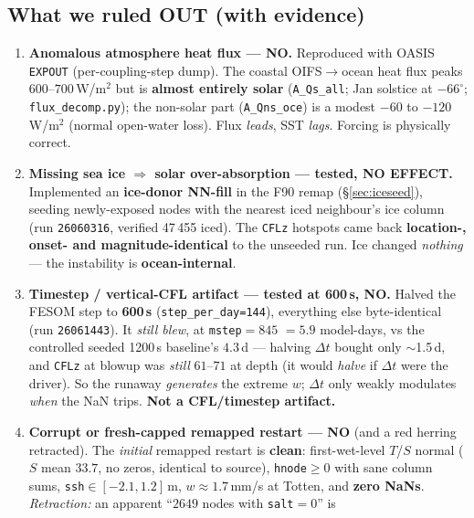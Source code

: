 \documentclass[11pt,a4paper]{article}
\newcommand{\code}[1]{\texttt{\small #1}}
\newcommand{\file}[1]{\texttt{\footnotesize #1}}
\begin{document}
\subsection{What we ruled OUT (with evidence)}
\begin{enumerate}[leftmargin=1.6em,itemsep=3pt]
  \item \textbf{Anomalous atmosphere heat flux --- NO.} Reproduced with OASIS \code{EXPOUT}
        (per-coupling-step dump). The coastal OIFS$\to$ocean heat flux peaks
        $600$--$700$\,W/m$^2$ but is \textbf{almost entirely solar} (\code{A\_Qs\_all};
        Jan solstice at $-66^\circ$; \file{flux\_decomp.py}); the non-solar part
        (\code{A\_Qns\_oce}) is a modest $-60$ to $-120$\,W/m$^2$ (normal open-water loss).
        Flux \emph{leads}, SST \emph{lags}. Forcing is physically correct.
  \item \textbf{Missing sea ice $\Rightarrow$ solar over-absorption --- tested, NO EFFECT.}
        Implemented an \textbf{ice-donor NN-fill} in the F90 remap (\S\ref{sec:iceseed}),
        seeding newly-exposed nodes with the nearest iced neighbour's ice column (run
        \code{26060316}, verified 47\,455 iced). The \code{CFLz} hotspots came back
        \textbf{location-, onset- and magnitude-identical} to the unseeded run. Ice changed
        \emph{nothing} --- the instability is \textbf{ocean-internal}.
  \item \textbf{Timestep / vertical-CFL artifact --- tested at 600\,s, NO.} Halved the FESOM
        step to \textbf{600\,s} (\code{step\_per\_day=144}), everything else byte-identical
        (run \code{26061443}). It \emph{still blew}, at \code{mstep}$=845$
        $=5.9$ model-days, vs the controlled seeded 1200\,s baseline's $4.3$\,d --- halving
        $\Delta t$ bought only $\sim$1.5\,d, and \code{CFLz} at blowup was \emph{still}
        $61$--$71$ at depth (it would \emph{halve} if $\Delta t$ were the driver). So the
        runaway \emph{generates} the extreme $w$; $\Delta t$ only weakly modulates \emph{when}
        the NaN trips. \textbf{Not a CFL/timestep artifact.}
  \item \textbf{Corrupt or fresh-capped remapped restart --- NO} (and a red herring retracted).
        The \emph{initial} remapped restart is \textbf{clean}: first-wet-level $T$/$S$ normal
        ($S$ mean $33.7$, no zeros, identical to source), \code{hnode}$\ge0$ with sane column
        sums, \code{ssh}$\in[-2.1,1.2]$\,m, $w\approx1.7$\,mm/s at Totten, and \textbf{zero
        NaNs}. \emph{Retraction:} an apparent ``$2649$ nodes with \code{salt}$=0$'' is

\end{enumerate}
\end{document}
